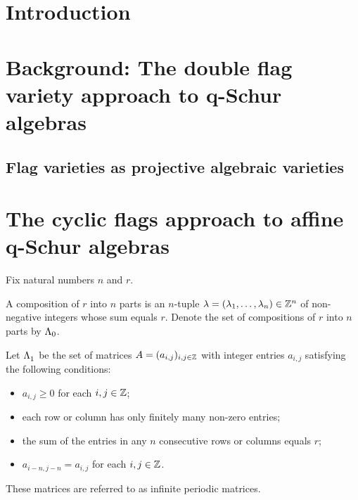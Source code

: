 \documentclass[a4paper, 11pt]{report}
\begin{document}
\maketitle

\tableofcontents

\chapter{Introduction}

\chapter{Background: The double flag variety approach to q-Schur algebras}

\section{Flag varieties as projective algebraic varieties}

\chapter{The cyclic flags approach to affine q-Schur algebras}

Fix natural numbers $n$ and $r$.

\begin{definition}[compositions]\label{def:compositions}
A composition of $r$ into $n$ parts is an $n$-tuple $\lambda=(\lambda_1,\ldots,\lambda_n)\in\mathbb{Z}^n$ of non-negative integers whose sum equals $r$. Denote the set of compositions of $r$ into $n$ parts by ${\Lambda_0}$.
\end{definition}

\begin{definition}\label{def:matrices}
Let $\Lambda_1^{}$ be the set of matrices $A=(a_{i,j})_{i,j\in\mathbb{Z}}$ with integer entries $a_{i,j}$ satisfying the following conditions: 
\begin{itemize}
\item
$a_{i,j}\geq 0$ for each $i,j\in\mathbb{Z}$;
\item
each row or column has only finitely many non-zero entries;
\item
the sum of the entries in any $n$ consecutive rows or columns equals $r$;
\item
$a_{i-n,j-n}=a_{i,j}$ for each $i,j\in\mathbb{Z}$.
\end{itemize}
These matrices are referred to as infinite periodic matrices.
\end{definition}
\end{document}
